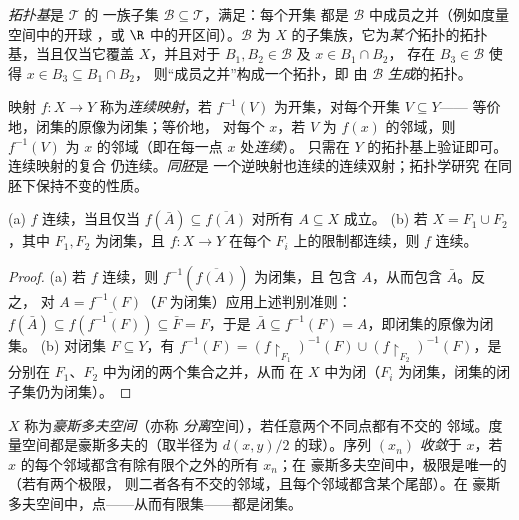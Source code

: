 \begin{definition}\label{def:b3:topology:basis}
\emph{拓扑基}是 $\mathcal T$ 的
一族子集 $\mathcal B \subseteq \mathcal T$，满足：每个开集
都是 $\mathcal B$ 中成员之并（例如度量空间中的开球
，或 $\R$ 中的开区间）。$\mathcal B$
为 $X$ 的子集族，它为\emph{某个}拓扑的拓扑基，当且仅当它覆盖
$X$，并且对于 $B_1, B_2 \in \mathcal B$ 及 $x \in B_1 \cap B_2$，
存在 $B_3 \in \mathcal B$ 使得 $x \in B_3 \subseteq B_1\cap B_2$，
则“成员之并”构成一个拓扑，即
由 $\mathcal B$ \emph{生成}的拓扑。
\end{definition}

\begin{definition}\label{def:b3:topology:continuity}
映射 $f \colon X \to Y$ 称为\emph{连续映射}，若
$f^{-1}(V)$ 为开集，对每个开集 $V \subseteq Y$——
等价地，闭集的原像为闭集；等价地，
对每个 $x$，若 $V$ 为 $f(x)$ 的邻域，则 $f^{-1}(V)$
为 $x$ 的邻域（即在每一点 $x$ 处\emph{连续}）。
只需在 $Y$ 的拓扑基上验证即可。连续映射的复合
仍连续。\emph{同胚}是
一个逆映射也连续的连续双射；拓扑学研究
在同胚下保持不变的性质。
\end{definition}

\begin{proposition}[连续性与闭包；粘合]
\label{prop:b3:topology:gluing}
(a) $f$ 连续，当且仅当 $f(\bar A) \subseteq \overline{f(A)}$
对所有 $A \subseteq X$ 成立。
(b) 若 $X = F_1 \cup F_2$，其中 $F_1, F_2$ 为闭集，且 $f\colon X
\to Y$ 在每个 $F_i$ 上的限制都连续，则 $f$
连续。
\end{proposition}

\begin{proof}
(a) 若 $f$ 连续，则 $f^{-1}(\overline{f(A)})$ 为闭集，且
包含 $A$，从而包含 $\bar A$。反之，
对 $A = f^{-1}(F)$（$F$ 为闭集）应用上述判别准则：$f(\bar A) \subseteq
\overline{f(f^{-1}(F))} \subseteq \bar F = F$，于是 $\bar A
\subseteq f^{-1}(F) = A$，即闭集的原像为闭集。
(b) 对闭集 $F \subseteq Y$，有 $f^{-1}(F) =
(f\restriction_{F_1})^{-1}(F) \cup (f\restriction_{F_2})^{-1}
(F)$，是分别在 $F_1$、$F_2$ 中为闭的两个集合之并，从而
在 $X$ 中为闭（$F_i$ 为闭集，闭集的闭子集仍为闭集）。
\end{proof}

\begin{definition}\label{def:b3:topology:hausdorff}
$X$ 称为\emph{豪斯多夫空间}（亦称
\emph{分离}空间），若任意两个不同点都有不交的
邻域。度量空间都是豪斯多夫的（取半径为
$d(x,y)/2$ 的球）。序列 $(x_n)$ \emph{收敛}于 $x$，若
$x$ 的每个邻域都含有除有限个之外的所有 $x_n$；在
豪斯多夫空间中，极限是唯一的（若有两个极限，
则二者各有不交的邻域，且每个邻域都含某个尾部）。在
豪斯多夫空间中，点——从而有限集——都是闭集。
\end{definition}

